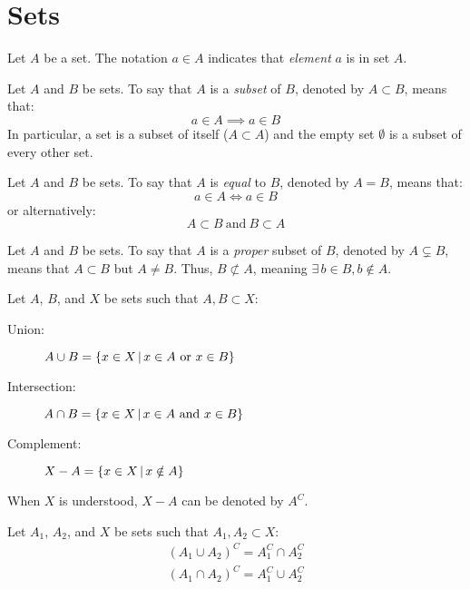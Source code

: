 \documentclass[letterpaper,12pt,fleqn]{article}
\begin{document}
\section*{Sets}

\begin{notation}[Element]
  Let \(A\) be a set.  The notation \(a\in A\) indicates that \emph{element} \(a\) is in set \(A\).
\end{notation}

\begin{definition}[Subset]
  Let \(A\) and \(B\) be sets.  To say that \(A\) is a \emph{subset} of \(B\), denoted by \(A\subset B\), means
  that:
  \[a\in A\implies a\in B\]
  In particular, a set is a subset of itself (\(A\subset A\)) and the empty set \(\emptyset\) is a subset of every
  other set.
\end{definition}

\begin{definition}[Equality]
  Let \(A\) and \(B\) be sets.  To say that \(A\) is \emph{equal} to \(B\), denoted by \(A=B\), means that:
  \[a\in A\iff a\in B\]
  or alternatively:
  \[A\subset B\ \text{and}\ B\subset A\]
\end{definition}

\begin{definition}[Proper]
  Let \(A\) and \(B\) be sets.  To say that \(A\) is a \emph{proper} subset of \(B\), denoted by \(A\subsetneq B\),
  means that \(A\subset B\) but \(A\ne B\).  Thus, \(B\not\subset A\), meaning \(\exists\,b\in B,b\notin A\).
\end{definition}

\begin{definition}[Operations]
  Let \(A\), \(B\), and \(X\) be sets such that \(A,B\subset X\):
  \begin{description}
  \item[Union:] \(A\cup B=\setb{x\in X}{x\in A\ \text{or}\ x\in B}\)
  \item[Intersection:] \(A\cap B=\setb{x\in X}{x\in A\ \text{and}\ x\in B}\)
  \item[Complement:] \(X-A=\left\{{x\in X}\,\middle|\,{x\notin A}\right\}\)
  \end{description}
  When \(X\) is understood, \(X-A\) can be denoted by \(A^C\).
\end{definition}

\begin{theorem}[DeMorgan]
  Let \(A_1\), \(A_2\), and \(X\) be sets such that \(A_1,A_2\subset X\):
  \begin{gather*}
  (A_1\cup A_2)^C=A_1^C\cap A_2^C \\
  (A_1\cap A_2)^C=A_1^C\cup A_2^C
  \end{gather*}
\end{theorem}
\end{document}
